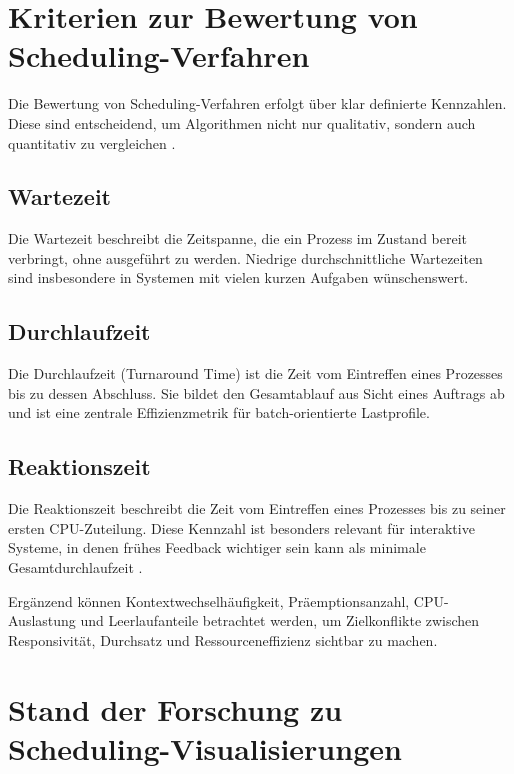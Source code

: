 \section{Kriterien zur Bewertung von Scheduling-Verfahren}

Die Bewertung von Scheduling-Verfahren erfolgt über klar definierte Kennzahlen. Diese sind entscheidend, um Algorithmen nicht nur qualitativ, sondern auch quantitativ zu vergleichen \cite{pinedo2016scheduling}.

\subsection{Wartezeit}

Die Wartezeit beschreibt die Zeitspanne, die ein Prozess im Zustand \glqq bereit\grqq{} verbringt, ohne ausgeführt zu werden. Niedrige durchschnittliche Wartezeiten sind insbesondere in Systemen mit vielen kurzen Aufgaben wünschenswert.

\subsection{Durchlaufzeit}

Die Durchlaufzeit (Turnaround Time) ist die Zeit vom Eintreffen eines Prozesses bis zu dessen Abschluss. Sie bildet den Gesamtablauf aus Sicht eines Auftrags ab und ist eine zentrale Effizienzmetrik für batch-orientierte Lastprofile.

\subsection{Reaktionszeit}

Die Reaktionszeit beschreibt die Zeit vom Eintreffen eines Prozesses bis zu seiner ersten CPU-Zuteilung. Diese Kennzahl ist besonders relevant für interaktive Systeme, in denen frühes Feedback wichtiger sein kann als minimale Gesamtdurchlaufzeit \cite{silberschatz2018operating,tanenbaum2014modern}.

Ergänzend können Kontextwechselhäufigkeit, Präemptionsanzahl, CPU-Auslastung und Leerlaufanteile betrachtet werden, um Zielkonflikte zwischen Responsivität, Durchsatz und Ressourceneffizienz sichtbar zu machen.

\section{Stand der Forschung zu Scheduling-Visualisierungen}

